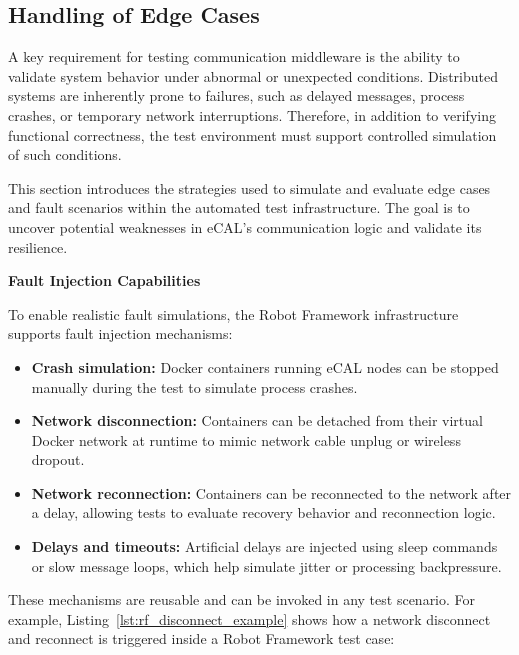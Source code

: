 \pagestyle{scrheadings}
	

\subsection{Handling of Edge Cases}

A key requirement for testing communication middleware is the ability to validate system behavior under abnormal or unexpected conditions. Distributed systems are inherently prone to failures, such as delayed messages, process crashes, or temporary network interruptions. Therefore, in addition to verifying functional correctness, the test environment must support controlled simulation of such conditions.

\vspace{1em}
This section introduces the strategies used to simulate and evaluate edge cases and fault scenarios within the automated test infrastructure. The goal is to uncover potential weaknesses in eCAL’s communication logic and validate its resilience.

\vspace{1em}
\textbf{Fault Injection Capabilities}

\vspace{0.4em}
To enable realistic fault simulations, the Robot Framework infrastructure supports fault injection mechanisms:

\begin{itemize}
	\item \textbf{Crash simulation:} Docker containers running eCAL nodes can be stopped manually during the test to simulate process crashes.
	\item \textbf{Network disconnection:} Containers can be detached from their virtual Docker network at runtime to mimic network cable unplug or wireless dropout.
	\item \textbf{Network reconnection:} Containers can be reconnected to the network after a delay, allowing tests to evaluate recovery behavior and reconnection logic.
	\item \textbf{Delays and timeouts:} Artificial delays are injected using sleep commands or slow message loops, which help simulate jitter or processing backpressure.
\end{itemize}

These mechanisms are reusable and can be invoked in any test scenario. For example, Listing~\ref{lst:rf_disconnect_example} shows how a network disconnect and reconnect is triggered inside a Robot Framework test case:

